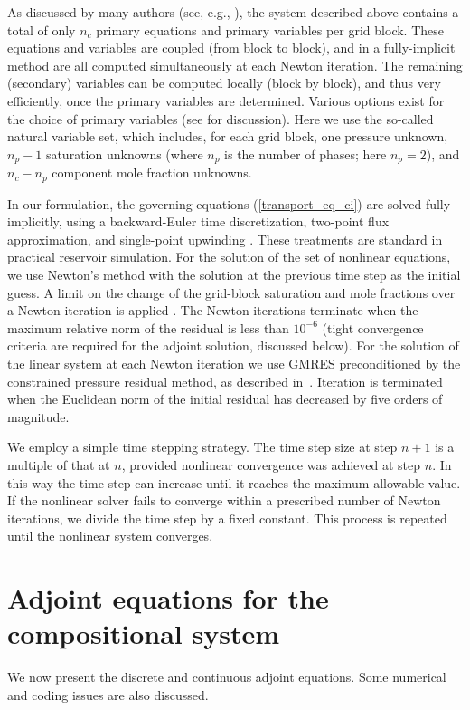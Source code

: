 \documentclass[twocolumn,numbook]{svjour3}          %
\begin{document}
As discussed by many authors (see, e.g.,
\cite{Coats:1980,Cao:Thesis,Voskov:2012,Young:1983}), the system described
above contains a total of only $n_c$ primary equations and primary variables per
grid block. These equations and variables are coupled (from block to block), and
in a fully-implicit method are all computed simultaneously at each Newton
iteration. The remaining (secondary) variables can be computed locally (block by
block), and thus very efficiently, once the primary variables are determined.
Various options exist for the choice of primary variables (see
\cite{Voskov:2012} for discussion). Here we use the so-called natural variable
set, which includes, for each grid block, one pressure unknown, $n_p-1$
saturation unknowns (where $n_p$ is the number of phases; here $n_p=2$), and $n_c-n_p$ component mole fraction unknowns.

In our formulation, the governing equations (\ref{transport_eq_ci}) are solved
fully-implicitly, using a backward-Euler time discretization, two-point flux
approximation, and single-point upwinding \cite{Aziz_book79}. These treatments
are standard in practical reservoir simulation. For the solution of the set of
nonlinear equations, we use Newton's method with the solution at the previous
time step as the initial guess. A limit on the change of the grid-block
saturation and mole fractions over a Newton iteration is applied
\cite{Younis:2010}. The Newton iterations terminate when the maximum relative
norm of the residual is less than $10^{-6}$ (tight convergence criteria are required for the adjoint solution, discussed below). For the solution of the
linear system at each Newton iteration we use GMRES preconditioned by the
constrained pressure residual method, as described in~\cite{CPRA}. Iteration is
terminated when the Euclidean norm of the initial residual has decreased by five
orders of magnitude.

We employ a simple time stepping strategy. The time step size at step $n+1$ is a
multiple of that at $n$, provided nonlinear convergence was achieved at step
$n$. In this way the time step can increase until it reaches the maximum
allowable value. If the nonlinear solver fails to converge within a prescribed number
of Newton iterations, we divide the time step by a fixed constant. This process
is repeated until the nonlinear system converges.



\section{Adjoint equations for the compositional system} \label{sec:adjoint}
We now present the discrete and continuous adjoint equations. Some numerical and coding issues are also discussed.
\end{document}
